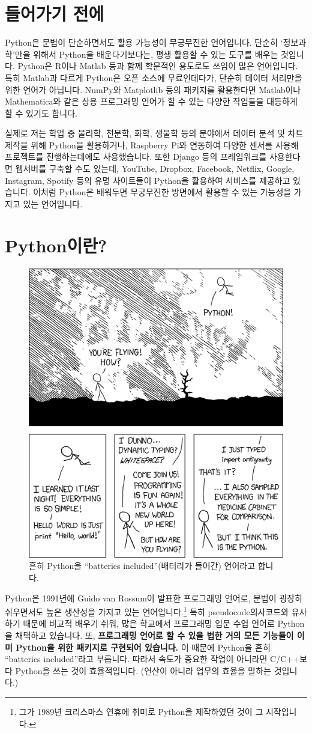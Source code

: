 \documentclass[../main.tex]{subfiles}
\begin{document}
\section{들어가기 전에}
Python은 문법이 단순하면서도 활용 가능성이 무궁무진한 언어입니다.
단순히 `정보과학'만을 위해서 Python을 배운다기보다는, 평생 활용할 수 있는 도구를 배우는 것입니다.
Python은 R이나 Matlab 등과 함께 학문적인 용도로도 쓰임이 많은 언어입니다.
특히 Matlab과 다르게 Python은 오픈 소스에 무료인데다가, 단순히 데이터 처리만을 위한 언어가 아닙니다.
NumPy와 Matplotlib 등의 패키지를 활용한다면 Matlab이나 Mathematica와 같은 상용 프로그래밍 언어가 할 수 있는 다양한 작업들을 대등하게 할 수 있기도 합니다.

실제로 저는 학업 중 물리학, 천문학, 화학, 생물학 등의 분야에서 데이터 분석 및 차트 제작을 위해 Python을 활용하거나, Raspberry Pi와 연동하여 다양한 센서를 사용해 프로젝트를 진행하는데에도 사용했습니다.
또한 Django 등의 프레임워크를 사용한다면 웹서버를 구축할 수도 있는데, YouTube, Dropbox, Facebook, Netflix, Google, Instagram, Spotify 등의 유명 사이트들이 Python을 활용하여 서비스를 제공하고 있습니다.
이처럼 Python은 배워두면 무궁무진한 방면에서 활용할 수 있는 가능성을 가지고 있는 언어입니다.

\section{Python이란?}
\begin{figure}[htbp]
  \centering
  \includegraphics[width=0.6\linewidth]{./figures/xkcd_python}
  \caption*{흔히 Python을 ``batteries included''(배터리가 들어간) 언어라고 합니다.}\label{fig:meme}
\end{figure}
Python은 1991년에 Guido van Rossum이 발표한 프로그래밍 언어로, 문법이 굉장히 쉬우면서도 높은 생산성을 가지고 있는 언어입니다.\footnote{그가 1989년 크리스마스 연휴에 취미로 Python을 제작하였던 것이 그 시작입니다.}
특히 pseudocode의사코드와 유사하기 때문에 비교적 배우기 쉬워, 많은 학교에서 프로그래밍 입문 수업 언어로 Python을 채택하고 있습니다.
또, \textbf{프로그래밍 언어로 할 수 있을 법한 거의 모든 기능들이 이미 Python을 위한 패키지로 구현되어 있습니다.}
이 때문에 Python을 흔히 ``batteries included''라고 부릅니다.
따라서 속도가 중요한 작업이 아니라면 C/C++보다 Python을 쓰는 것이 효율적입니다.
(연산이 아니라 업무의 효율을 말하는 것입니다.)
\end{document}
